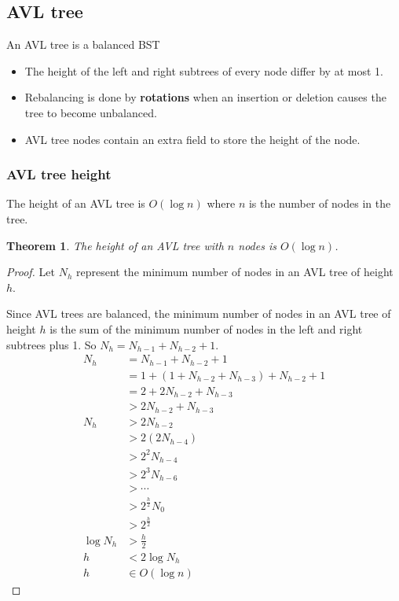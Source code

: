 \documentclass[letterpaper,12pt]{article}
\newtheorem{theorem}{Theorem}
\begin{document}
\subsection{AVL tree}
An AVL tree is a balanced BST\begin{itemize}
    \item The height of the left and right subtrees of every node differ by at most 1.
    \item Rebalancing is done by \textbf{rotations} when an insertion or deletion causes the tree to become unbalanced.
    \item AVL tree nodes contain an extra field to store the height of the node.
\end{itemize}
\subsubsection{AVL tree height}
The height of an AVL tree is $O(\log n)$ where $n$ is the number of nodes in the tree. 
\begin{theorem}
    The height of an AVL tree with $n$ nodes is $O(\log n)$.
\end{theorem}
\begin{proof}
    Let $N_h$ represent the minimum number of nodes in an AVL tree of height $h$.

    Since AVL trees are balanced, the minimum number of nodes in an AVL tree of height $h$ is the sum of the minimum number of nodes in the left and right subtrees plus 1. So $N_h = N_{h-1} + N_{h-2} + 1$.
    \begin{align*}
        N_h &= N_{h-1} + N_{h-2} + 1 \\
        &= 1+ (1+N_{h-2}+N_{h-3}) + N_{h-2} + 1 \\
        &= 2 + 2N_{h-2} + N_{h-3} \\
        &> 2N_{h-2} + N_{h-3} \\
        N_h &> 2N_{h-2} \\
        &> 2(2N_{h-4}) \\
        &> 2^2N_{h-4} \\
        &> 2^3N_{h-6} \\
        &> \cdots \\
        &> 2^{\frac{h}{2}}N_0 \\
        &> 2^{\frac{h}{2}} \\
        \log N_h &> \frac{h}{2} \\
        h &< 2\log N_h \\
        h &\in O(\log n)
    \end{align*}
\end{proof}
\end{document}
